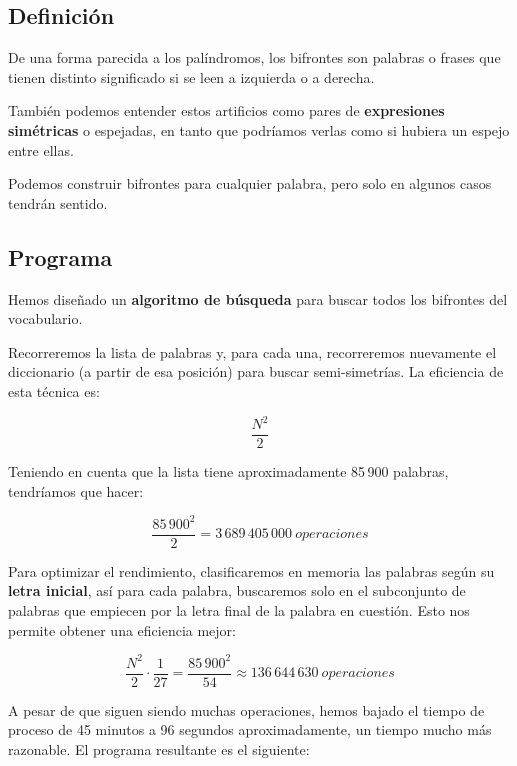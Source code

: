 \documentclass[10pt,a4paper]{article}
\begin{document}
	\subsection{Definición}
	
	De una forma parecida a los palíndromos, los bifrontes son palabras o frases que tienen distinto significado si se leen a izquierda o a derecha. \cite{bifronte} 

	También podemos entender estos artificios como pares de \textbf{expresiones simétricas} o espejadas, en tanto que podríamos verlas como si hubiera un espejo entre ellas.
	
	Podemos construir bifrontes para cualquier palabra, pero solo en algunos casos tendrán sentido. 
	
	\subsection{Programa}
	
	Hemos diseñado un \textbf{algoritmo de búsqueda} para buscar todos los bifrontes del vocabulario.
	
    Recorreremos la lista de palabras y, para cada una, recorreremos nuevamente el diccionario (a partir de esa posición) para buscar semi-simetrías. La eficiencia de esta técnica es:
    
    \begin{equation}
    \frac{N^2}{2}
    \end{equation}
    
    \newpage
    Teniendo en cuenta que la lista tiene aproximadamente 85\,900 palabras, tendríamos que hacer:
    
    \begin{equation}
    \frac{85\,900^2}{2}=3\,689\,405\,000 \ operaciones
    \end{equation}
    
    Para optimizar el rendimiento, clasificaremos en memoria las palabras según su \textbf{letra inicial}, así para cada palabra, buscaremos solo en el subconjunto de palabras que empiecen por la letra final de la palabra en cuestión. Esto nos permite obtener una eficiencia mejor:
    
    \begin{equation}
    \frac{N^2}{2} \cdot \frac{1}{27} = \frac{85\,900^2}{54} \approx 136\,644\,630 \ operaciones
    \end{equation}
    
    A pesar de que siguen siendo muchas operaciones, hemos bajado el tiempo de proceso de 45 minutos a 96 segundos aproximadamente, un tiempo mucho más razonable. El programa resultante es el siguiente:
    
\end{document}
